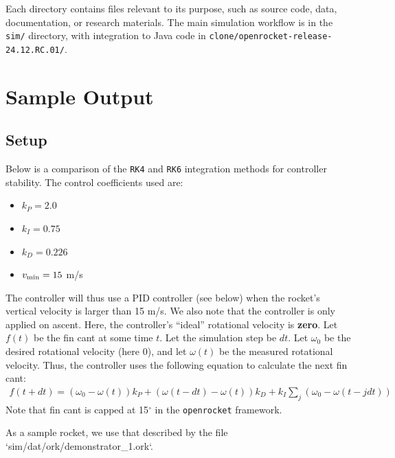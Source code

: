\documentclass{amsdtx}
\begin{document}
Each directory contains files relevant to its purpose, such as source
code, data, documentation, or research materials. The main simulation
workflow is in the \texttt{sim/} directory, with integration to Java
code in \texttt{clone/openrocket-release-24.12.RC.01/}.
\newpage
\section{Sample Output}
\subsection{Setup}
Below is a comparison of the \verb|RK4| and \verb|RK6| integration methods for controller stability. The control coefficients used are:
\begin{multicols}{4}
\begin{itemize}
  \item $k_P=2.0$
  \item $k_I=0.75$
  \item $k_D=0.226$
  \item $v_{\rm min}=15$ m/s
\end{itemize}
\end{multicols}
The controller will thus use a PID controller (see below) when the rocket's vertical velocity is larger than 15 m/s. We also note that the controller is only applied on ascent. Here, the controller's ``ideal'' rotational velocity is \textbf{zero}. Let $f(t)$ be the fin cant at some time $t$. Let the simulation step be $dt$. Let $\omega_0$ be the desired rotational velocity (here $0$), and let $\omega(t)$ be the measured rotational velocity. Thus, the controller uses the following equation to calculate the next fin cant:
\begin{align}
  f(t+dt) = (\omega_0-\omega(t))k_P + (\omega(t-dt)-\omega(t))k_D + k_I\sum_j(\omega_0-\omega(t-jdt))
\end{align}
Note that fin cant is capped at 15$^\circ$ in the \verb|openrocket| framework.

As a sample rocket, we use that described by the file `sim/dat/ork/demonstrator_1.ork`.
\end{document}
